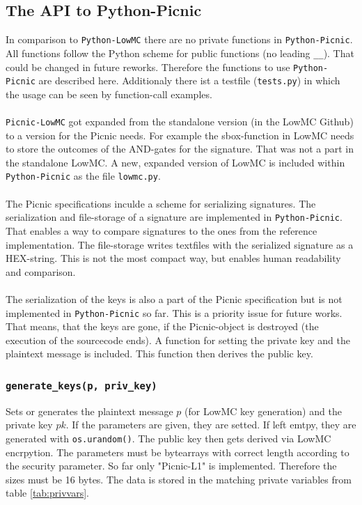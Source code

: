 \documentclass[]{article}
\begin{document}
\subsection{The API to Python-Picnic}
In comparison to \texttt{Python-LowMC} there are no private functions in \texttt{Python-Picnic}. All functions follow the Python scheme for public functions (no leading \texttt{\_\_}). That could be changed in future reworks. Therefore the functions to use \texttt{Python-Picnic} are described here. Additionaly there ist a testfile (\texttt{tests.py}) in which the usage can be seen by function-call examples.\\ \\
\texttt{Picnic-LowMC} got expanded from the standalone version (in the LowMC Github) to a version for the Picnic needs. For example the sbox-function in LowMC needs to store the outcomes of the AND-gates for the signature. That was not a part in the standalone LowMC. A new, expanded version of LowMC is included within \texttt{Python-Picnic} as the file \texttt{lowmc.py}.\\ \\
The Picnic specifications inculde a scheme for serializing signatures. The serialization and file-storage of a signature are implemented in \texttt{Python-Picnic}. That enables a way to compare signatures to the ones from the reference implementation. The file-storage writes textfiles with the serialized signature as a HEX-string. This is not the most compact way, but enables human readability and comparison.\\ \\
The serialization of the keys is also a part of the Picnic specification but is not implemented in \texttt{Python-Picnic} so far. This is a priority issue for future works. That means, that the keys are gone, if the Picnic-object is destroyed (the execution of the sourcecode ends). A function for setting the private key and the plaintext message is included. This function then derives the public key.
\subsubsection{\texttt{generate\_keys(p, priv\_key)}}
Sets or generates the plaintext message $p$ (for LowMC key generation) and the private key $pk$. If the parameters are given, they are setted. If left emtpy, they are generated with \texttt{os.urandom()}. The public key then gets derived via LowMC encrpytion. The parameters must be bytearrays with correct length according to the security parameter. So far only "Picnic-L1" is implemented. Therefore the sizes must be 16 bytes. The data is stored in the matching private variables from table \ref{tab:privvars}.
\end{document}
